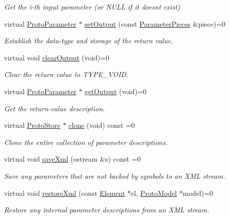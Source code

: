 \begin{DoxyCompactItemize}
\begin{DoxyCompactList}\small\item\em Get the i-\/th input parameter (or N\+U\+LL if it doesn\textquotesingle{}t exist) \end{DoxyCompactList}\item 
virtual \mbox{\hyperlink{class_proto_parameter}{Proto\+Parameter}} $\ast$ \mbox{\hyperlink{class_proto_store_a51a4d28fac8dc3ba5037190ed0cc0edc}{set\+Output}} (const \mbox{\hyperlink{struct_parameter_pieces}{Parameter\+Pieces}} \&piece)=0
\begin{DoxyCompactList}\small\item\em Establish the data-\/type and storage of the return value. \end{DoxyCompactList}\item 
virtual void \mbox{\hyperlink{class_proto_store_a02928f3bab6c98f728a1759e3127e5c4}{clear\+Output}} (void)=0
\begin{DoxyCompactList}\small\item\em Clear the return value to T\+Y\+P\+E\+\_\+\+V\+O\+ID. \end{DoxyCompactList}\item 
virtual \mbox{\hyperlink{class_proto_parameter}{Proto\+Parameter}} $\ast$ \mbox{\hyperlink{class_proto_store_aeb240f8e1b797060196c4bb7be000197}{get\+Output}} (void)=0
\begin{DoxyCompactList}\small\item\em Get the return-\/value description. \end{DoxyCompactList}\item 
virtual \mbox{\hyperlink{class_proto_store}{Proto\+Store}} $\ast$ \mbox{\hyperlink{class_proto_store_aaefd44fa7803bbeb4d91059cc6480419}{clone}} (void) const =0
\begin{DoxyCompactList}\small\item\em Clone the entire collection of parameter descriptions. \end{DoxyCompactList}\item 
virtual void \mbox{\hyperlink{class_proto_store_ac6e8cc6bfcb10d84a69c3f6011c5de06}{save\+Xml}} (ostream \&s) const =0
\begin{DoxyCompactList}\small\item\em Save any parameters that are not backed by symbols to an X\+ML stream. \end{DoxyCompactList}\item 
virtual void \mbox{\hyperlink{class_proto_store_a7311214c33205be191361836d716f99b}{restore\+Xml}} (const \mbox{\hyperlink{class_element}{Element}} $\ast$el, \mbox{\hyperlink{class_proto_model}{Proto\+Model}} $\ast$model)=0
\begin{DoxyCompactList}\small\item\em Restore any internal parameter descriptions from an X\+ML stream. \end{DoxyCompactList}\end{DoxyCompactItemize}


